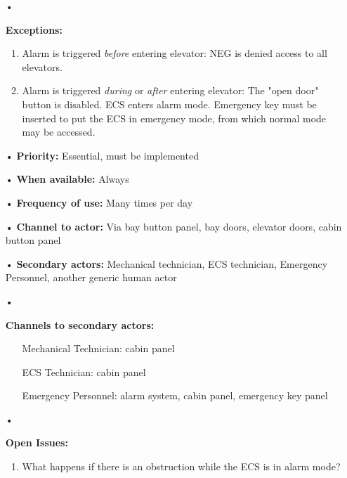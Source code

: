 \documentclass[12pt]{article}
\begin{document}
\begin{itemize}
{\begin{enumerate}
		        \end{enumerate}}
			\item[•]{\textbf{Exceptions:} 
			    \begin{enumerate}
		        	\item Alarm is triggered \textit{before} entering elevator: NEG is denied access to all elevators.
		        	\item Alarm is triggered \textit{during} or \textit{after} entering elevator: The "open door" button is disabled.
		        	ECS enters alarm mode. Emergency key must be inserted to put the ECS in emergency mode, from which normal mode may
		        	be accessed.
		        \end{enumerate}}
			\item[•] \textbf{Priority:} Essential, must be implemented
			\item[•] \textbf{When available:} Always
			\item[•] \textbf{Frequency of use:} Many times per day
			\item[•] \textbf{Channel to actor:} Via bay button panel, bay doors, elevator doors, cabin button panel
			\item[•] \textbf{Secondary actors:} Mechanical technician, ECS technician, Emergency Personnel, another 
			generic human actor		
			\item[•]{\textbf{Channels to secondary actors:}
			    \begin{itemize}
					\item[] Mechanical Technician: cabin panel
					\item[] ECS Technician: cabin panel
					\item[] Emergency Personnel: alarm system, cabin panel, emergency key panel	    
			    \end{itemize}}
			\item[•]{\textbf{Open Issues:}
				\begin{enumerate}
					\item What happens if there is an obstruction while the ECS is in alarm mode?
				\end{enumerate}} 
		\end{itemize}
	
\end{document}
